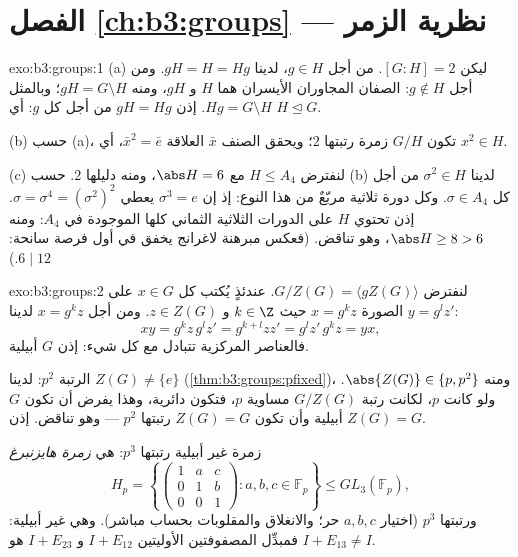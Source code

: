 \section*{الفصل \ref{ch:b3:groups} --- نظرية الزمر}

\begin{solution}{exo:b3:groups:1}
(a) ليكن $[G:H] = 2$. من أجل $g \in H$، لدينا $gH = H = Hg$. ومن
أجل $g \notin
H$: الصفان المجاوران الأيسران هما $H$ و $gH$، ومنه $gH = G \setminus H$؛
وبالمثل $Hg = G \setminus H$. إذن $gH = Hg$ من أجل كل $g$: أي $H
\trianglelefteq G$.

(b) حسب (a)، تكون $G/H$ زمرة رتبتها $2$؛ ويحقق الصنف $\bar x$
العلاقة $\bar x^2 = \bar e$، أي $x^2 \in H$.

(c) لنفترض $H \leq A_4$ مع $\abs H = 6$، ومنه دليلها $2$. حسب (b)
لدينا $\sigma^2 \in H$ من أجل كل $\sigma \in A_4$. وكل دورة ثلاثية
مربّعٌ من هذا النوع: إذ إن $\sigma^3 = e$ يعطي $\sigma =
\sigma^4 = (\sigma^2)^2$. إذن تحتوي
$H$ على الدورات الثلاثية الثماني كلها الموجودة في $A_4$: ومنه
$\abs H \geq 8 > 6$، وهو تناقض. (فعكس مبرهنة لاغرانج يخفق في أول فرصة سانحة:
$6 \mid 12$.)
\end{solution}

\begin{solution}{exo:b3:groups:2}
لنفترض $G/Z(G) = \langle gZ(G) \rangle$. عندئذٍ يُكتب كل $x \in G$ على الصورة $x = g^k z$
حيث $k \in \Z$ و $z \in Z(G)$. ومن أجل $x = g^kz$ لدينا $y =
g^l z'$:
\[
xy = g^k z\, g^l z' = g^{k+l} z z' = g^l z'\, g^k z = yx,
\]
فالعناصر المركزية تتبادل مع كل شيء: إذن $G$ أبيلية.

الرتبة $p^2$: لدينا $Z(G) \neq \{e\}$ (\cref{thm:b3:groups:pfixed})، ومنه $\abs{Z(G)} \in \{p, p^2\}$. ولو كانت
$p$، لكانت رتبة $G/Z(G)$ مساوية $p$، فتكون دائرية، وهذا يفرض أن
تكون $G$ أبيلية وأن تكون $Z(G) =
G$ رتبتها $p^2$ --- وهو تناقض. إذن
$Z(G) = G$.

زمرة غير أبيلية رتبتها $p^3$: هي \emph{زمرة هايزنبرغ}
\[
H_p = \left\{ \begin{pmatrix} 1 & a & c\\ 0 & 1 & b\\ 0 & 0 & 1
\end{pmatrix} : a, b, c \in \mathbb F_p \right\}
\leq GL_3(\mathbb F_p),
\]
ورتبتها $p^3$ (اختيار $a, b, c$ حر؛ والانغلاق والمقلوبات بحساب
مباشر). وهي غير أبيلية: فمبدِّل المصفوفتين الأوليتين $I + E_{12}$
و $I + E_{23}$ هو $I + E_{13} \neq I$.
\end{solution}

